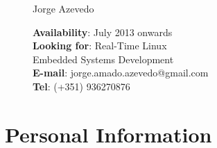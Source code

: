 



\hspace{0cm}
\begin{figure}

\begin{minipage}[t]{0.6\textwidth}
\vspace{0pt}\raggedright

{\Huge Jorge Azevedo}

\vspace{1.5mm}


\vspace*{6mm}

\textbf{Availability}: July 2013 onwards\\
\textbf{Looking for}: Real-Time Linux\\
\hspace{66pt}Embedded Systems Development\\
\vspace*{2mm} 
\textbf{E-mail}: jorge.amado.azevedo@gmail.com\\
\textbf{Tel}: \small{(+351) 936270876}

\end{minipage}
\hfill
\begin{minipage}[t]{0.4\textwidth}\vspace{0pt} \centering
{}
\end{minipage}

\end{figure}

\section*{Personal Information}



